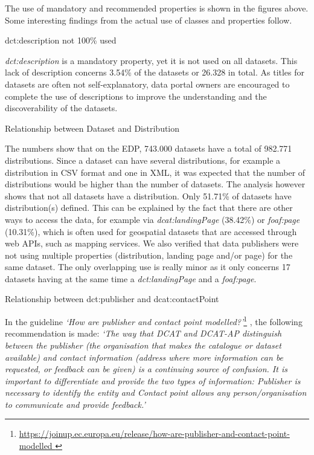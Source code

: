\documentclass[<options>]{elsarticle}
\begin{document}
The use of mandatory and recommended properties is shown in the figures above. Some interesting findings from the actual use of classes and properties follow.

dct:description not 100\% used

\textit{dct:description} is a mandatory property, yet it is not used on all datasets. This lack of description concerns 3.54\% of the datasets or 26.328 in total. As titles for datasets are often not self-explanatory, data portal owners are encouraged to complete the use of descriptions to improve the understanding and the discoverability of the datasets.

Relationship between Dataset and Distribution

The numbers show that on the EDP, 743.000 datasets have a total of 982.771 distributions. Since a dataset can have several distributions, for example a distribution in CSV format and one in XML, it was expected that the number of distributions would be higher than the number of datasets.
The analysis however shows that not all datasets have a distribution. Only 51.71\% of datasets have distribution(s) defined. This can be explained by the fact that there are other ways to access the data, for example via \textit{dcat:landingPage} (38.42\%) or \textit{foaf:page} (10.31\%), which is often used for geospatial datasets that are accessed through web APIs, such as mapping services.  We also verified that data publishers were not using multiple properties (distribution, landing page and/or page) for the same dataset. The only overlapping use is really minor as it only concerns 17 datasets having at the same time a \textit{dct:landingPage} and a \textit{foaf:page}.

Relationship between dct:publisher and dcat:contactPoint

In the guideline \textit{‘How are publisher and contact point modelled?’}\footnote{\href{ https://joinup.ec.europa.eu/release/how-are-publisher-and-contact-point-modelled }{ https://joinup.ec.europa.eu/release/how-are-publisher-and-contact-point-modelled }} 
, the following recommendation is made:
\textit{‘The way that DCAT and DCAT-AP distinguish between the publisher (the organisation that makes the catalogue or dataset available) and contact information (address where more information can be requested, or feedback can be given) is a continuing source of confusion. It is important to differentiate and provide the two types of information: Publisher is necessary to identify the entity and Contact point allows any person/organisation to communicate and provide feedback.’}
\end{document}
